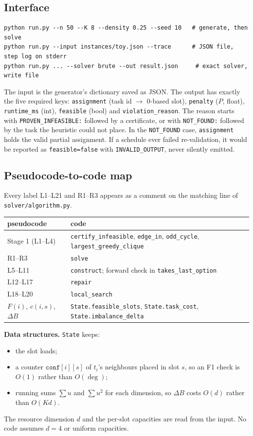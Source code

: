 \subsection{Interface}
\begin{verbatim}
python run.py --n 50 --K 8 --density 0.25 --seed 10   # generate, then solve
python run.py --input instances/toy.json --trace      # JSON file, step log on stderr
python run.py ... --solver brute --out result.json     # exact solver, write file
\end{verbatim}
The input is the generator's dictionary saved as JSON. The output has
exactly the five required keys:
\texttt{assignment} (task id $\to$ 0-based slot), \texttt{penalty} ($P$,
float), \texttt{runtime\_ms} (int), \texttt{feasible} (bool) and
\texttt{violation\_reason}. The reason starts with
\texttt{PROVEN\_INFEASIBLE:} followed by a certificate, or with
\texttt{NOT\_FOUND:} followed by the task the heuristic could not place. In
the \texttt{NOT\_FOUND} case, \texttt{assignment} holds the valid partial
assignment. If a schedule ever failed re-validation, it would be reported
as \texttt{feasible=false} with \texttt{INVALID\_OUTPUT}, never silently
emitted.

\subsection{Pseudocode-to-code map}
Every label L1--L21 and R1--R3 appears as a comment on the matching line
of \texttt{solver/algorithm.py}.
\begin{center}\small
\begin{tabular}{l l}
\toprule
pseudocode & code\\
\midrule
Stage 1 (L1--L4) & \texttt{certify\_infeasible}, \texttt{edge\_in}, \texttt{odd\_cycle}, \texttt{largest\_greedy\_clique}\\
R1--R3 & \texttt{solve}\\
L5--L11 & \texttt{construct}; forward check in \texttt{takes\_last\_option}\\
L12--L17 & \texttt{repair}\\
L18--L20 & \texttt{local\_search}\\
$F(i)$, $c(i,s)$, $\Delta B$ & \texttt{State.feasible\_slots}, \texttt{State.task\_cost}, \texttt{State.imbalance\_delta}\\
\bottomrule
\end{tabular}
\end{center}

\textbf{Data structures.} \texttt{State} keeps:
\begin{itemize}
\item the slot loads;
\item a counter $\texttt{conf}[i][s]$ of $t_i$'s neighbours placed in slot
  $s$, so an F1 check is $O(1)$ rather than $O(\deg)$;
\item running sums $\sum u$ and $\sum u^2$ for each dimension, so
  $\Delta B$ costs $O(d)$ rather than $O(Kd)$.
\end{itemize}
The resource dimension $d$ and the per-slot capacities are read from the
input. No code assumes $d=4$ or uniform capacities.

